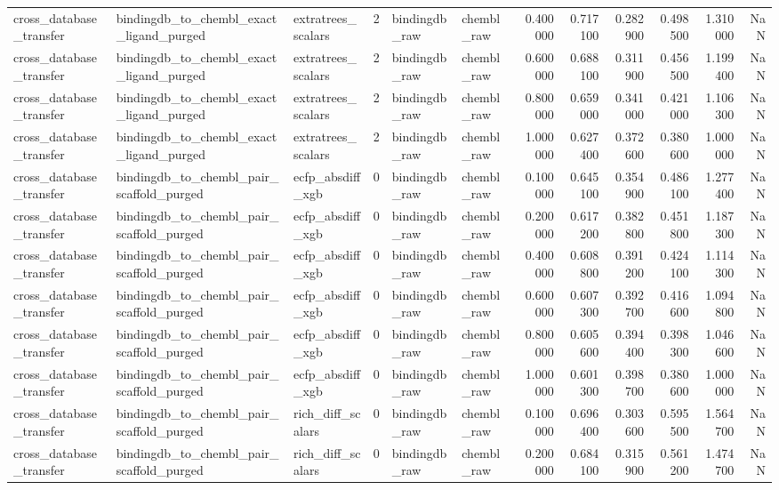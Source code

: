 \begin{longtable}{lllrllrrrrrr}
cross\_database\_transfer & bindingdb\_to\_chembl\_exact\_ligand\_purged & extratrees\_scalars & 2 & bindingdb\_raw & chembl\_raw & 0.400000 & 0.717100 & 0.282900 & 0.498500 & 1.310000 & NaN \\
cross\_database\_transfer & bindingdb\_to\_chembl\_exact\_ligand\_purged & extratrees\_scalars & 2 & bindingdb\_raw & chembl\_raw & 0.600000 & 0.688100 & 0.311900 & 0.456500 & 1.199400 & NaN \\
cross\_database\_transfer & bindingdb\_to\_chembl\_exact\_ligand\_purged & extratrees\_scalars & 2 & bindingdb\_raw & chembl\_raw & 0.800000 & 0.659000 & 0.341000 & 0.421000 & 1.106300 & NaN \\
cross\_database\_transfer & bindingdb\_to\_chembl\_exact\_ligand\_purged & extratrees\_scalars & 2 & bindingdb\_raw & chembl\_raw & 1.000000 & 0.627400 & 0.372600 & 0.380600 & 1.000000 & NaN \\
cross\_database\_transfer & bindingdb\_to\_chembl\_pair\_scaffold\_purged & ecfp\_absdiff\_xgb & 0 & bindingdb\_raw & chembl\_raw & 0.100000 & 0.645100 & 0.354900 & 0.486100 & 1.277400 & NaN \\
cross\_database\_transfer & bindingdb\_to\_chembl\_pair\_scaffold\_purged & ecfp\_absdiff\_xgb & 0 & bindingdb\_raw & chembl\_raw & 0.200000 & 0.617200 & 0.382800 & 0.451800 & 1.187300 & NaN \\
cross\_database\_transfer & bindingdb\_to\_chembl\_pair\_scaffold\_purged & ecfp\_absdiff\_xgb & 0 & bindingdb\_raw & chembl\_raw & 0.400000 & 0.608800 & 0.391200 & 0.424100 & 1.114300 & NaN \\
cross\_database\_transfer & bindingdb\_to\_chembl\_pair\_scaffold\_purged & ecfp\_absdiff\_xgb & 0 & bindingdb\_raw & chembl\_raw & 0.600000 & 0.607300 & 0.392700 & 0.416600 & 1.094800 & NaN \\
cross\_database\_transfer & bindingdb\_to\_chembl\_pair\_scaffold\_purged & ecfp\_absdiff\_xgb & 0 & bindingdb\_raw & chembl\_raw & 0.800000 & 0.605600 & 0.394400 & 0.398300 & 1.046600 & NaN \\
cross\_database\_transfer & bindingdb\_to\_chembl\_pair\_scaffold\_purged & ecfp\_absdiff\_xgb & 0 & bindingdb\_raw & chembl\_raw & 1.000000 & 0.601300 & 0.398700 & 0.380600 & 1.000000 & NaN \\
cross\_database\_transfer & bindingdb\_to\_chembl\_pair\_scaffold\_purged & rich\_diff\_scalars & 0 & bindingdb\_raw & chembl\_raw & 0.100000 & 0.696400 & 0.303600 & 0.595500 & 1.564700 & NaN \\
cross\_database\_transfer & bindingdb\_to\_chembl\_pair\_scaffold\_purged & rich\_diff\_scalars & 0 & bindingdb\_raw & chembl\_raw & 0.200000 & 0.684100 & 0.315900 & 0.561200 & 1.474700 & NaN \\

\end{longtable}
